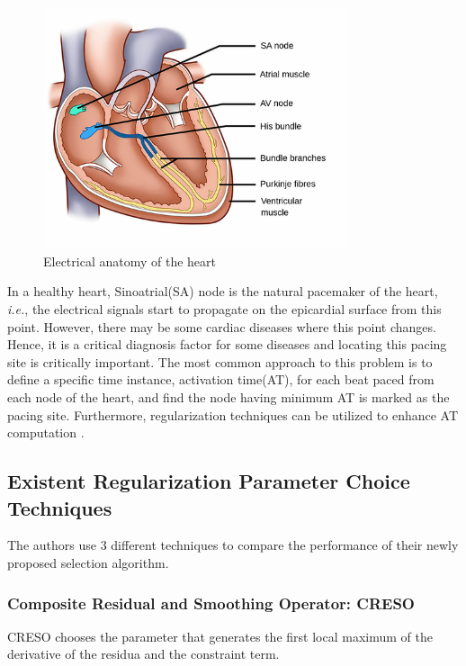 \documentclass[draftcls, onecolumn, journal]{IEEEtran}
\begin{document}
\begin{figure}[h]
\centering
\includegraphics[width=0.8\textwidth]{../images/SA_Node.png}
\caption{Electrical anatomy of the heart}\label{fig:SANODE}
\end{figure}

In a healthy heart, Sinoatrial(SA) node is the natural pacemaker of the heart, \textit{i.e.}, the electrical signals start to propagate on the epicardial surface from this point. However, there may be some cardiac diseases where this point changes. Hence, it is a critical diagnosis factor for some diseases and locating this pacing site is critically important. The most common approach to this problem is to define a specific time instance, activation time(AT), for each beat paced from each node of the heart, and find the node having minimum AT is marked as the pacing site. Furthermore, regularization techniques can be utilized to enhance AT computation \cite*{erem2013using}.

\newpage
\subsection{Existent Regularization Parameter Choice Techniques}\label{subsec:paramselect}

The authors use 3 different techniques to compare the performance of their newly proposed selection algorithm. 

\subsubsection{Composite Residual and Smoothing Operator: CRESO}

CRESO \cite{colli1985mathematical} chooses the parameter that generates the first local maximum of the derivative of the residua and the constraint term. 
\end{document}
